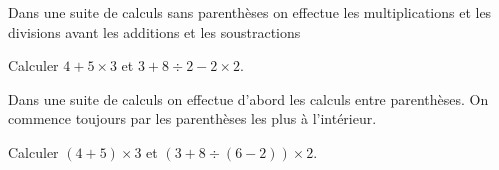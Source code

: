 \documentclass[14pt,a4paper]{extarticle}
\begin{document}
\begin{myprop}
	Dans une suite de calculs sans parenthèses on effectue les multiplications et les divisions avant les additions et les soustractions
\end{myprop}

\begin{myexs}
	Calculer $4 + 5 \times 3$ et $3 + 8 \div 2 - 2 \times 2$.\\
	
	\iftoggle{eleve}{%
		
		\vspace*{2cm}
		
	}{%
		\begin{itemize}[label=\textbullet]
			\item $4 + 5 \times 3 = 4 + 15 = 19$ \\
			
			
			\item $ 3 + 8 \div 2 - 2 \times 2 = 3 + 4 - 4 = 3 $
		\end{itemize}
		
		
		
		
	}
\end{myexs}



\begin{myprop}
	Dans une suite de calculs on effectue d'abord les calculs entre parenthèses. On commence toujours par les parenthèses les plus à l'intérieur.
\end{myprop}

\begin{myexs}
	Calculer $(4 + 5) \times 3$ et $(3 + 8 \div (6 - 2)) \times 2$.\\
	
	\iftoggle{eleve}{%
		
		\vspace*{2cm}
		
	}{%
		\begin{itemize}[label=\textbullet]
			\item $(4 + 5) \times 3 = 9 \times 3 = 27$ \\
			
			
			\item $ (3 + 8 \div (6 - 2)) \times 2 = (3 + 8 \div 4) \times 2 = (3 + 2) \times 2 = 5 \times 2 = 10$
		\end{itemize}	
		
	}
\end{myexs}
\end{document}
